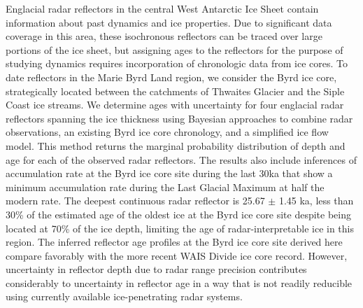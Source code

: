 Englacial radar reflectors in the central West Antarctic Ice Sheet contain information about past dynamics and ice properties. Due to significant data coverage in this area, these isochronous reflectors can be traced over large portions of the ice sheet, but assigning ages to the reflectors for the purpose of studying dynamics requires incorporation of chronologic data from ice cores. To date reflectors in the Marie Byrd Land region, we consider the Byrd ice core, strategically located between the catchments of Thwaites Glacier and the Siple Coast ice streams. We determine ages with uncertainty for four englacial radar reflectors spanning the ice thickness using Bayesian approaches to combine radar observations, an existing Byrd ice core chronology, and a simplified ice flow model. This method returns the marginal probability distribution of depth and age for each of the observed radar reflectors. The results also include inferences of accumulation rate at the Byrd ice core site during the last 30ka that show a minimum accumulation rate during the Last Glacial Maximum at half the modern rate. The deepest continuous radar reflector is 25.67 $\pm$ 1.45 ka, less than 30\% of the estimated age of the oldest ice at the Byrd ice core site despite being located at 70\% of the ice depth, limiting the age of radar-interpretable ice in this region. The inferred reflector age profiles at the Byrd ice core site derived here compare favorably with the more recent WAIS Divide ice core record. However, uncertainty in reflector depth due to radar range precision contributes considerably to uncertainty in reflector age in a way that is not readily reducible using currently available ice-penetrating radar systems.